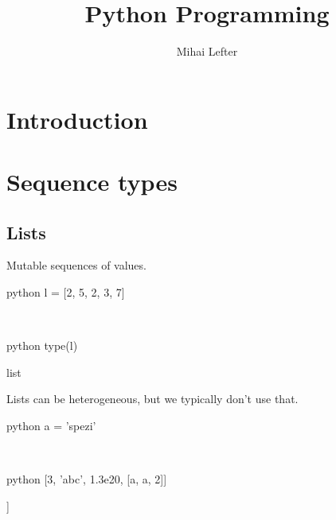 \documentclass[aspectratio=1610,slidestop]{beamer}
\author{Mihai Lefter}
\title{Python Programming}
\begin{document}


\section{Introduction}
\makeTableOfContents


\section{Sequence types}

\subsection{Lists}
\begin{pframe}
Mutable sequences of values.
 \begin{ipython}
  \begin{pythonin}{python}
l = [2, 5, 2, 3, 7]
  \end{pythonin}
  \\
  \begin{pythonin}{python}
type(l)
  \end{pythonin}
  \begin{pythonout}
list
  \end{pythonout}
 \end{ipython}
 \medskip

 Lists can be heterogeneous, but we typically don't use that.
 \begin{ipython}
  \begin{pythonin}{python}
a = 'spezi'
  \end{pythonin}
  \\
  \begin{pythonin}{python}
[3, 'abc', 1.3e20, [a, a, 2]]
  \end{pythonin}
  \begin{pythonout}
[3, 'abc', 1.3e+20, ['spezi', 'spezi', 2]]
  \end{pythonout}
 \end{ipython}
\end{pframe}
\end{document}
